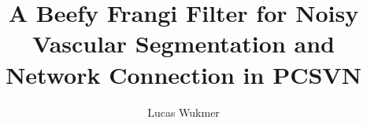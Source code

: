 \documentclass[]{csulb-thesis}
\author{Lucas Wukmer}  					                %
\title{A Beefy Frangi Filter for Noisy Vascular Segmentation and Network Connection in PCSVN}
\begin{document}
\begin{preliminary}

\begin{abstract}

\end{abstract}

\maketitle

\begin{acknowledgements}

\end{acknowledgements}

\setcounter{tocdepth}{3}  %
\tableofcontents

\listoftables

\listoffigures

\end{preliminary}



		













\end{document}

